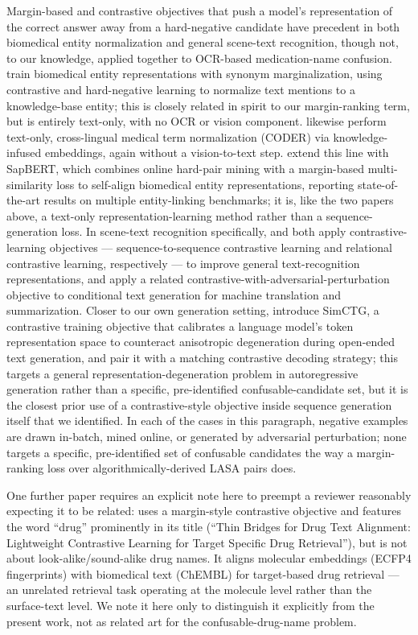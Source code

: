 \documentclass[fleqn,10pt]{wlpeerj}
\begin{document}
Margin-based and contrastive objectives that push a model's representation of the correct answer away from a hard-negative candidate have precedent in both biomedical entity normalization and general scene-text recognition, though not, to our knowledge, applied together to OCR-based medication-name confusion. \citet{sung2020biomedical} train biomedical entity representations with synonym marginalization, using contrastive and hard-negative learning to normalize text mentions to a knowledge-base entity; this is closely related in spirit to our margin-ranking term, but is entirely text-only, with no OCR or vision component. \citet{yuan2022coder} likewise perform text-only, cross-lingual medical term normalization (CODER) via knowledge-infused embeddings, again without a vision-to-text step. \citet{liu2021self} extend this line with SapBERT, which combines online hard-pair mining with a margin-based multi-similarity loss to self-align biomedical entity representations, reporting state-of-the-art results on multiple entity-linking benchmarks; it is, like the two papers above, a text-only representation-learning method rather than a sequence-generation loss. In scene-text recognition specifically, \citet{aberdam2021sequence} and \citet{zhang2023relational} both apply contrastive-learning objectives --- sequence-to-sequence contrastive learning and relational contrastive learning, respectively --- to improve general text-recognition representations, and \citet{lee2021contrastive} apply a related contrastive-with-adversarial-perturbation objective to conditional text generation for machine translation and summarization. Closer to our own generation setting, \citet{su2022contrastive} introduce SimCTG, a contrastive training objective that calibrates a language model's token representation space to counteract anisotropic degeneration during open-ended text generation, and pair it with a matching contrastive decoding strategy; this targets a general representation-degeneration problem in autoregressive generation rather than a specific, pre-identified confusable-candidate set, but it is the closest prior use of a contrastive-style objective inside sequence generation itself that we identified. In each of the cases in this paragraph, negative examples are drawn in-batch, mined online, or generated by adversarial perturbation; none targets a specific, pre-identified set of confusable candidates the way a margin-ranking loss over algorithmically-derived LASA pairs does.

One further paper requires an explicit note here to preempt a reviewer reasonably expecting it to be related: \citet{tupakula2025thin} uses a margin-style contrastive objective and features the word ``drug'' prominently in its title (``Thin Bridges for Drug Text Alignment: Lightweight Contrastive Learning for Target Specific Drug Retrieval''), but is not about look-alike/sound-alike drug names. It aligns molecular embeddings (ECFP4 fingerprints) with biomedical text (ChEMBL) for target-based drug retrieval --- an unrelated retrieval task operating at the molecule level rather than the surface-text level. We note it here only to distinguish it explicitly from the present work, not as related art for the confusable-drug-name problem.
\end{document}
